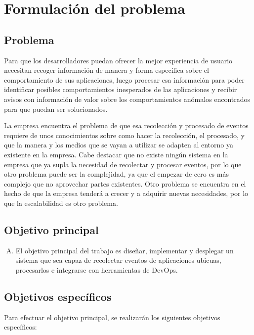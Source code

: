 \chapter{Formulación del problema}

\section{Problema}
Para que los desarrolladores puedan ofrecer la mejor experiencia de usuario necesitan recoger información de manera y forma específica sobre el comportamiento de sus aplicaciones, luego procesar esa información para poder identificar posibles comportamientos inesperados de las aplicaciones y recibir avisos con información de valor sobre los comportamientos anómalos encontrados para que puedan ser solucionados.

La empresa encuentra el problema de que esa recolección y procesado de eventos requiere de unos conocimientos sobre como hacer la recolección, el procesado, y que la manera y los medios que se vayan a utilizar se adapten al entorno ya existente en la empresa. Cabe destacar que no existe ningún sistema en la empresa que ya supla la necesidad de recolectar y procesar eventos, por lo que otro problema puede ser la complejidad, ya que el empezar de cero es más complejo que no aprovechar partes existentes. Otro problema se encuentra en el hecho de que la empresa tenderá a crecer y a adquirir nuevas necesidades, por lo que la escalabilidad es otro problema.

\section{Objetivo principal}
\begin{enumerate}[A)]
	\item El objetivo principal del trabajo es diseñar, implementar y desplegar un sistema que sea capaz de recolectar eventos de aplicaciones ubicuas, procesarlos e integrarse con herramientas de DevOps.
\end{enumerate}

\section{Objetivos específicos}

Para efectuar el objetivo principal, se realizarán los siguientes objetivos específicos:

